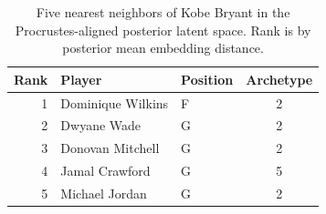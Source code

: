 \begin{table}[htbp]
  \centering\small
  \begin{tabular}{rllc}
    \toprule
    Rank & Player & Position & Archetype \\
    \midrule
    1 & Dominique Wilkins & F & 2 \\
    2 & Dwyane Wade & G & 2 \\
    3 & Donovan Mitchell & G & 2 \\
    4 & Jamal Crawford & G & 5 \\
    5 & Michael Jordan & G & 2 \\
    \bottomrule
  \end{tabular}
  \caption{Five nearest neighbors of Kobe Bryant in the Procrustes-aligned posterior latent space. Rank is by posterior mean embedding distance.}
  \label{tab:Kobe_Bryant_neighbors}
\end{table}

